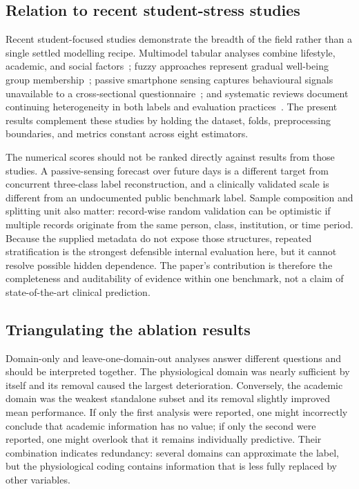 \documentclass[review]{elsarticle}
\begin{document}
\subsection{Relation to recent student-stress studies}
Recent student-focused studies demonstrate the breadth of the field rather than a single settled modelling recipe. Multimodel tabular analyses combine lifestyle, academic, and social factors~\cite{defilippis2024}; fuzzy approaches represent gradual well-being group membership~\cite{han2023}; passive smartphone sensing captures behavioural signals unavailable to a cross-sectional questionnaire~\cite{shvetcov2024}; and systematic reviews document continuing heterogeneity in both labels and evaluation practices~\cite{daza2023,cruz2025,humayun2025}. The present results complement these studies by holding the dataset, folds, preprocessing boundaries, and metrics constant across eight estimators.

The numerical scores should not be ranked directly against results from those studies. A passive-sensing forecast over future days is a different target from concurrent three-class label reconstruction, and a clinically validated scale is different from an undocumented public benchmark label. Sample composition and splitting unit also matter: record-wise random validation can be optimistic if multiple records originate from the same person, class, institution, or time period. Because the supplied metadata do not expose those structures, repeated stratification is the strongest defensible internal evaluation here, but it cannot resolve possible hidden dependence. The paper's contribution is therefore the completeness and auditability of evidence within one benchmark, not a claim of state-of-the-art clinical prediction.

\subsection{Triangulating the ablation results}
Domain-only and leave-one-domain-out analyses answer different questions and should be interpreted together. The physiological domain was nearly sufficient by itself and its removal caused the largest deterioration. Conversely, the academic domain was the weakest standalone subset and its removal slightly improved mean performance. If only the first analysis were reported, one might incorrectly conclude that academic information has no value; if only the second were reported, one might overlook that it remains individually predictive. Their combination indicates redundancy: several domains can approximate the label, but the physiological coding contains information that is less fully replaced by other variables.
\end{document}
